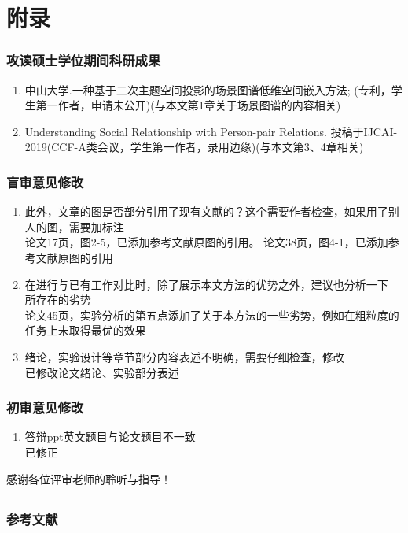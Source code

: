 \documentclass[UTF8]{beamer}
\newcommand{\kai}{\CJKfamily{kai}}
\begin{document}
\section{附录}

\begin{frame}
    \frametitle{攻读硕士学位期间科研成果}
    \small{
         \begin{enumerate}
         \item 中山大学.一种基于二次主题空间投影的场景图谱低维空间嵌入方法; (专利，学生第一作者，申请未公开)(与本文第1章关于场景图谱的内容相关)
         \item Understanding Social Relationship with Person-pair Relations. 投稿于IJCAI-2019(CCF-A类会议，学生第一作者，录用边缘)(与本文第3、4章相关)
         \end{enumerate}
    }
\end{frame}

\begin{frame}
    \frametitle{盲审意见修改}
    \small{
         \begin{enumerate}

         \item 此外，文章的图是否部分引用了现有文献的？这个需要作者检查，如果用了别人的图，需要加标注\\
         {\kai 论文17页，图2-5，已添加参考文献原图的引用。
                论文38页，图4-1，已添加参考文献原图的引用}
         \item 在进行与已有工作对比时，除了展示本文方法的优势之外，建议也分析一下
                    所存在的劣势\\
         {\kai 论文45页，实验分析的第五点添加了关于本方法的一些劣势，例如在粗粒度的任务上未取得最优的效果}
         \item 绪论，实验设计等章节部分内容表述不明确，需要仔细检查，修改 \\
         {\kai 已修改论文绪论、实验部分表述}
         \end{enumerate}
    }
\end{frame}

\begin{frame}
    \frametitle{初审意见修改}
    \small{
         \begin{enumerate}

         \item 答辩ppt英文题目与论文题目不一致\\
         {\kai 已修正}
         \end{enumerate}
    }
\end{frame}

\begin{frame}
    \centerline{\large{感谢各位评审老师的聆听与指导！}}
\end{frame}

\subsection{ }
\begin{frame}[allowframebreaks]
    \frametitle{参考文献}
    \tiny
    \printbibliography
\end{frame}
\end{document}
